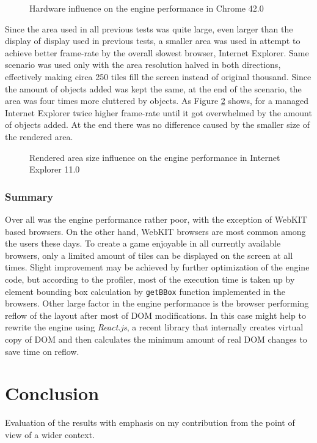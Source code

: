 \documentclass[11pt,oneside, final]{fithesis2}
\begin{document}
\begin{figure}[h]
	\centering
	
	\caption{Hardware influence on the engine performance in Chrome 42.0}
	\label{performance-hw}
\end{figure}

Since the area used in all previous tests was quite large, even larger than the display of display used in previous tests, a smaller area was used in attempt to achieve better frame-rate by the overall slowest browser, Internet Explorer. Same scenario was used only with the area resolution halved in both directions, effectively making circa 250 tiles fill the screen instead of original thousand. Since the amount of objects added was kept the same, at the end of the scenario, the area was four times more cluttered by objects. As Figure \ref{performance-size} shows, for a managed Internet Explorer twice higher frame-rate until it got overwhelmed by the amount of objects added. At the end there was no difference caused by the smaller size of the rendered area.

\begin{figure}[h]
	\centering
	
	\caption{Rendered area size influence on the engine performance in Internet Explorer 11.0}
	\label{performance-size}
\end{figure}

\subsection{Summary}
Over all was the engine performance rather poor, with the exception of WebKIT based browsers. On the other hand, WebKIT browsers are most common among the users these days\cite{browserstats}. To create a game enjoyable in all currently available browsers, only a limited amount of tiles can be displayed on the screen at all times. Slight improvement may be achieved by further optimization of the engine code, but according to the profiler, most of the execution time is taken up by element bounding box calculation by \texttt{getBBox} function implemented in the browsers\cite{svgtypes}. Other large factor in the engine performance is the browser performing reflow of the layout after most of DOM modifications. In this case might help to rewrite the engine using \emph{React.js}, a recent library that internally creates virtual copy of DOM and then calculates the minimum amount of real DOM changes to save time on reflow\cite{sobo}.

\chapter{Conclusion}
Evaluation of the results with emphasis on my contribution from the point of view of a wider context.
\end{document}
